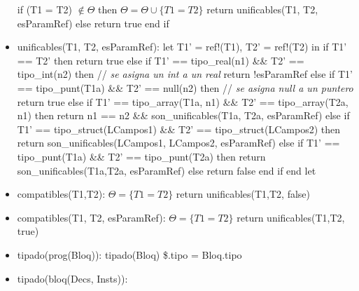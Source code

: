 \documentclass[11pt]{article}
\begin{document}
\begin{itemize}
                \subitem if (T1 = T2) $\notin \Theta$ then
                    \subsubitem $\Theta = \Theta \cup \{T1 = T2\}$
                    \subsubitem return unificables(T1, T2, esParamRef)
                \subitem else
                    \subsubitem return true
                \subitem end if
            \item unificables(T1, T2, esParamRef): 
                \subitem let T1' = ref!(T1), T2' = ref!(T2) in
                    \subsubitem if T1' == T2' then
                        \subsubitem \hspace{2em} return true
                    \subsubitem else if T1' == tipo\_real(n1) \&\&  T2' == tipo\_int(n2) then \/// \textit{se asigna un int a un real}
                        \subsubitem \hspace{2em} return !esParamRef
                    \subsubitem else if T1' == tipo\_punt(T1a) \&\&  T2' == null(n2) then \/// \textit{se asigna null a un puntero}
                        \subsubitem \hspace{2em} return true
                    \subsubitem else if T1' == tipo\_array(T1a, n1) \&\&  T2' == tipo\_array(T2a, n1) then
                        \subsubitem \hspace{2em} return n1 == n2 \&\&  son\_unificables(T1a, T2a, esParamRef)
                    \subsubitem else if T1' == tipo\_struct(LCampos1) \&\&  T2' == tipo\_struct(LCampos2) then
                        \subsubitem \hspace{2em} return son\_unificables(LCampos1, LCampos2, esParamRef)
                    \subsubitem else if T1' == tipo\_punt(T1a) \&\&  T2' == tipo\_punt(T2a) then
                        \subsubitem \hspace{2em} return son\_unificables(T1a,T2a, esParamRef)
                    \subsubitem else
                        \subsubitem \hspace{2em} return false
                    \subsubitem end if 
                \subitem end let
            \item compatibles(T1,T2): 
                \subitem $\Theta = \{T1=T2\} $
                \subitem return unificables(T1,T2, false)
            \item compatibles(T1, T2, esParamRef): 
                \subitem $\Theta = \{T1=T2\} $
                \subitem return unificables(T1,T2, true)
            \item tipado(prog(Bloq)): 
                \subitem tipado(Bloq)
                \subitem \$.tipo = Bloq.tipo
            \item tipado(bloq(Decs, Insts)): 

\end{itemize}
\end{document}
